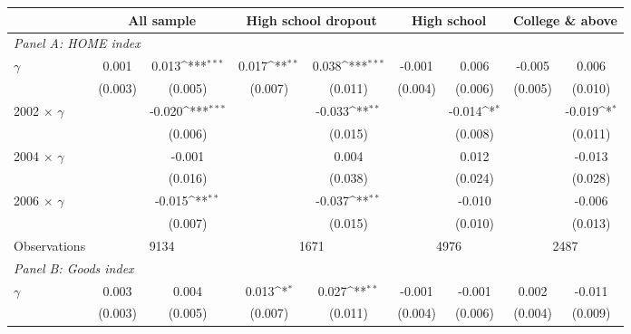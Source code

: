 {
\def\sym#1{\ifmmode^{#1}\else\(^{#1}\)\fi}
\begin{tabular}{l*{8}{c}}
\toprule
                &\multicolumn{2}{c}{All sample}&\multicolumn{2}{c}{High school dropout}&\multicolumn{2}{c}{High school}&\multicolumn{2}{c}{College \& above}\\
\midrule
\multicolumn{9}{l}{\textit{Panel A: HOME index}} \\
$\gamma$        &    0.001         &    0.013\sym{***}&    0.017\sym{**} &    0.038\sym{***}&   -0.001         &    0.006         &   -0.005         &    0.006         \\
                &  (0.003)         &  (0.005)         &  (0.007)         &  (0.011)         &  (0.004)         &  (0.006)         &  (0.005)         &  (0.010)         \\

2002 $\times$ $\gamma$&                  &   -0.020\sym{***}&                  &   -0.033\sym{**} &                  &   -0.014\sym{*}  &                  &   -0.019\sym{*}  \\
                &                  &  (0.006)         &                  &  (0.015)         &                  &  (0.008)         &                  &  (0.011)         \\

2004 $\times$ $\gamma$&                  &   -0.001         &                  &    0.004         &                  &    0.012         &                  &   -0.013         \\
                &                  &  (0.016)         &                  &  (0.038)         &                  &  (0.024)         &                  &  (0.028)         \\

2006 $\times$ $\gamma$&                  &   -0.015\sym{**} &                  &   -0.037\sym{**} &                  &   -0.010         &                  &   -0.006         \\
                &                  &  (0.007)         &                  &  (0.015)         &                  &  (0.010)         &                  &  (0.013)         \\
\midrule
Observations    &     \multicolumn{2}{c}{9134}     &     \multicolumn{2}{c}{1671}         &     \multicolumn{2}{c}{4976}         & \multicolumn{2}{c}{2487}        \\

\midrule
\multicolumn{9}{l}{\textit{Panel B: Goods index}} \\
$\gamma$        &    0.003         &    0.004         &    0.013\sym{*}  &    0.027\sym{**} &   -0.001         &   -0.001         &    0.002         &   -0.011         \\
                &  (0.003)         &  (0.005)         &  (0.007)         &  (0.011)         &  (0.004)         &  (0.006)         &  (0.004)         &  (0.009)         \\



\end{tabular}}
